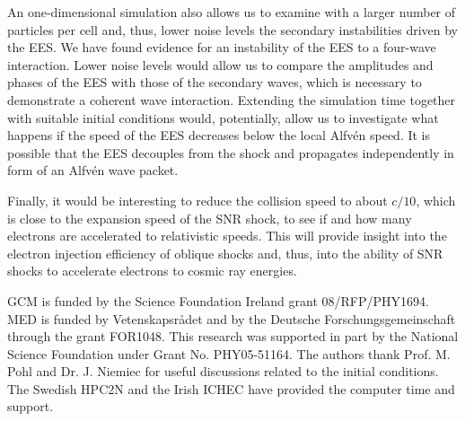 \documentclass[structabstract]{aa}
\begin{document}
An one-dimensional simulation also allows us to examine with a larger number 
of particles per cell and, thus, lower noise levels the secondary instabilities
driven by the EES. We have found evidence for an instability of the EES to 
a four-wave interaction. Lower noise levels would allow us to compare the 
amplitudes and phases of the EES with those of the secondary waves, which
is necessary to demonstrate a coherent wave interaction. Extending the 
simulation time together with suitable initial conditions would, potentially, 
allow us to investigate what happens if the speed of the EES decreases below 
the local Alfv\'en speed. It is possible that the EES decouples from the shock 
and propagates independently in form of an Alfv\'en wave packet.

Finally, it would be interesting to reduce the collision speed to about
$c/10$, which is close to the expansion speed of the SNR shock, to see 
if and how many electrons are accelerated to relativistic speeds.
This will provide insight into the electron injection efficiency of oblique 
shocks and, thus, into the ability of SNR shocks to accelerate electrons to 
cosmic ray energies. 

\begin{acknowledgements}
GCM is funded by the Science Foundation Ireland grant 08/RFP/PHY1694. MED 
is funded by Vetenskapsr\aa det and by the Deutsche Forschungsgemeinschaft 
through the grant FOR1048. This research was supported in part by the 
National Science Foundation under Grant No. PHY05-51164. The authors thank 
Prof. M. Pohl and Dr. J. Niemiec for useful discussions related to the 
initial conditions. The Swedish HPC2N and the Irish ICHEC have provided the 
computer time and support. 
\end{acknowledgements}
\end{document}

